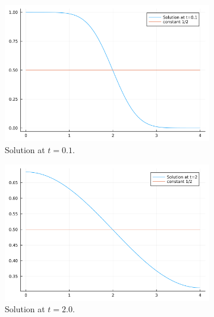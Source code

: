 \documentclass[12pt]{report}
\begin{document}
\begin{solution}
    \begin{figure}[H]
        \begin{subfigure}[b]{0.45\linewidth}
            \centering
            \includegraphics[width=\linewidth]{images/3-1.png}
            \caption{Solution at $t=0.1$.}
            \label{3sol:a}
            \vspace{4ex}
        \end{subfigure}%
        \begin{subfigure}[b]{0.45\linewidth}
            \centering
            \includegraphics[width=\linewidth]{images/3-2.png}
            \caption{Solution at $t=2.0$.}
            \label{3sol:b}
            \vspace{4ex}
        \end{subfigure}
        \begin{subfigure}[b]{0.45\linewidth}
            \centering

\end{subfigure}
\end{figure}
\end{solution}
\end{document}
